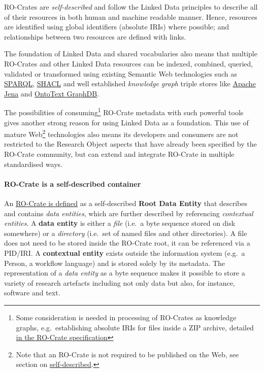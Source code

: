 {RO-Crates are \emph{self-described} and follow the Linked Data
principles to describe all of their resources in both human and machine
readable manner. Hence, resources are identified using global
identifiers (absolute IRIs) where possible; and relationships between
two resources are defined with links.

The foundation of Linked Data and shared vocabularies also means that
multiple RO-Crates and other Linked Data resources can be indexed,
combined, queried, validated or transformed using existing Semantic Web
technologies such as
\href{https://www.w3.org/TR/sparql11-overview}{SPARQL},
\href{https://www.w3.org/TR/shacl/}{SHACL} and well established
\emph{knowledge graph} triple stores like
\href{https://jena.apache.org/}{Apache Jena} and
\href{https://www.ontotext.com/products/graphdb/}{OntoText GraphDB}.

The possibilities of consuming\footnote{Some consideration is needed in
  processing of RO-Crates as knowledge graphs, e.g.~establishing
  absolute IRIs for files inside a ZIP archive, detailed
  \href{https://www.researchobject.org/ro-crate/1.1/appendix/relative-uris.html}{in
  the RO-Crate specification}} RO-Crate metadata with such powerful
tools gives another strong reason for using Linked Data as a foundation.
This use of mature Web\footnote{Note that an RO-Crate is not required to
  be published on the Web, see section on
  \protect\hyperlink{selfdescribed}{self-described}.} technologies also
means its developers and consumers are not restricted to the Research
Object aspects that have already been specified by the RO-Crate
community, but can extend and integrate RO-Crate in multiple
standardised ways.

\hypertarget{selfdescribed}{%
\paragraph{RO-Crate is a self-described container}\label{selfdescribed}}

An
\href{https://www.researchobject.org/ro-crate/1.1/structure.html\#ro-crate-metadata-file-ro-crate-metadatajson}{RO-Crate
is defined} as a self-described \textbf{Root Data Entity} that describes
and contains \emph{data entities}, which are further described by
referencing \emph{contextual entities}. A \textbf{data entity} is either
a \emph{file} (i.e.~a byte sequence stored on disk somewhere) or a
\emph{directory} (i.e.~set of named files and other directories). A file
does not need to be stored inside the RO-Crate root, it can be
referenced via a PID/IRI. A \textbf{contextual entity} exists outside
the information system (e.g.~a Person, a workflow language) and is
stored solely by its metadata. The representation of a \emph{data
entity} as a byte sequence makes it possible to store a variety of
research artefacts including not only data but also, for instance,
software and text.

}
